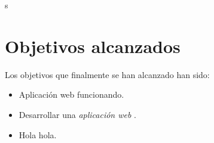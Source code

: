 s\section{Objetivos alcanzados}\label{objetivos-alcanzados}
Los objetivos que finalmente se han alcanzado han sido: 
\begin{itemize}
\tightlist
\item
  Aplicación web funcionando. 
\item
  Desarrollar una \emph{aplicación web} . 
\item
  Hola hola.
\end{itemize}

